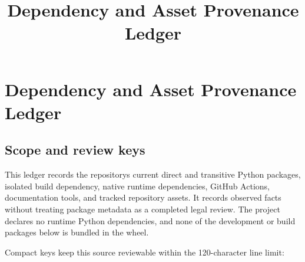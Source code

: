 \documentclass[
  letterpaper,
]{article}
\title{Dependency and Asset Provenance Ledger}
\author{}
\date{}
\newcounter{none} %
\begin{document}
\maketitle

{
\setcounter{tocdepth}{3}
\tableofcontents
}
\section{Dependency and Asset Provenance Ledger}\label{dependency-and-asset-provenance-ledger}

\subsection{Scope and review keys}\label{scope-and-review-keys}

This ledger records the repository\textquotesingle s current direct and transitive Python packages, isolated build
dependency, native runtime dependencies, GitHub Actions, documentation tools, and tracked repository assets. It records
observed facts without treating package metadata as a completed legal review. The project declares no runtime Python
dependencies, and none of the development or build packages below is bundled in the wheel.

Compact keys keep this source reviewable within the 120-character line limit:
\end{document}
